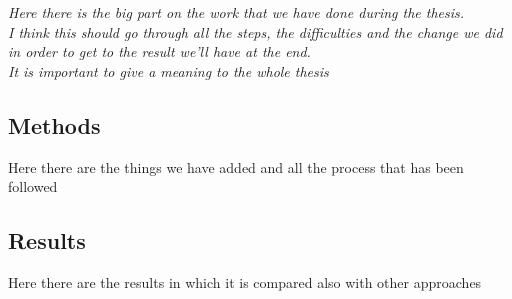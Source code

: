 \textit{Here there is the big part on the work that we have done during the thesis. \\
I think this should go through all the steps, the difficulties and the change we did in order to get to the result we'll have at the end. \\
It is important to give a meaning to the whole thesis
}
\subsection{Methods}
Here there are the things we have added and all the process that has been followed

\subsection{Results}
Here there are the results in which it is compared also with other approaches